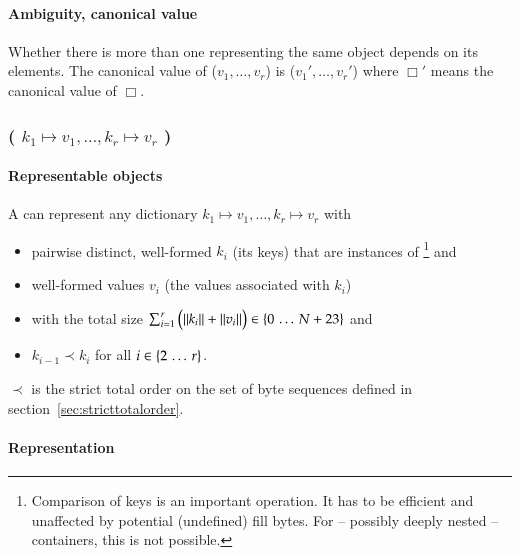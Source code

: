 \paragraph{Ambiguity, canonical value}

Whether there is more than one \DborSequenceValue{} representing the same object depends on its
elements.
The canonical value of \DborSequenceValue{}($v_1, \ldots, v_r$) is
\DborSequenceValue($v_1', \ldots, v_r'$)
where $\Box'$ means the canonical value of $\Box$.


\subsubsection{\DborDictionaryValue(\texorpdfstring{%
    $k_1 \mapsto v_1, \ldots, k_r \mapsto v_r$%
}{%
    k1 -> v1, ..., kr -> vr%
})}
\hypertarget{sec:def:DictionaryValue}{}

\paragraph{Representable objects}

A \DborDictionaryValue{} can represent any dictionary $k_1 \mapsto v_1, \ldots, k_r \mapsto v_r$ with
\begin{itemize}
    \item
    pairwise distinct, well-formed $k_i$ (its keys) that are instances of \DborElementaryValue
    \footnote{
        Comparison of keys is an important operation.
        It has to be efficient and unaffected by potential (undefined) fill bytes.
        For -- possibly deeply nested -- containers, this is not possible.
    }
    and

    \item
    well-formed values $v_i$ (the values associated with $k_i$)

    \item
    with the total size $\sum_{i = 1}^r \big(\|k_i\| + \|v_i\|\big) \in \{0 \,\ldots\, N + 23\}$ and

    \item
    $k_{i - 1} \prec k_{i}$ for all $i \in \{2 \,\ldots\, r\}$.
\end{itemize}

${\prec}$ is the strict total order on the set of byte sequences defined in section~\ref{sec:stricttotalorder}.

\paragraph{Representation}

